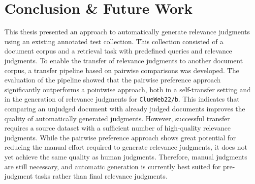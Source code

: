 \chapter{Conclusion \& Future Work}\label{conclusion}

This thesis presented an approach to automatically generate relevance judgments using an existing annotated test collection. This collection consisted of a document corpus and a retrieval task with predefined queries and relevance judgments. To enable the transfer of relevance judgments to another document corpus, a transfer pipeline based on pairwise comparisons was developed. The evaluation of the pipeline showed that the pairwise preference approach significantly outperforms a pointwise approach, both in a self-transfer setting and in the generation of relevance judgments for \texttt{ClueWeb22/b}. This indicates that comparing an unjudged document with already judged documents improves the quality of automatically generated judgments. However, successful transfer requires a source dataset with a sufficient number of high-quality relevance judgments. While the pairwise preference approach shows great potential for reducing the manual effort required to generate relevance judgments, it does not yet achieve the same quality as human judgments. Therefore, manual judgments are still necessary, and automatic generation is currently best suited for pre-judgment tasks rather than final relevance judgments.
